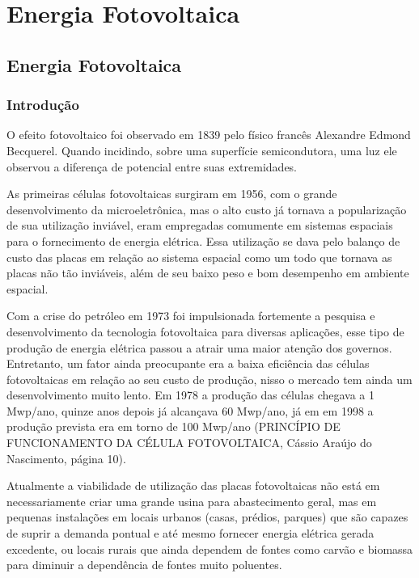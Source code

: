 \part{Energia Fotovoltaica}
\chapter[Energia Fotovoltaica]{Energia Fotovoltaica}

\section{Introdução}

O efeito fotovoltaico foi observado em 1839 pelo físico francês Alexandre Edmond Becquerel. Quando incidindo, sobre uma superfície semicondutora, uma luz ele observou a diferença de potencial entre suas extremidades.

As primeiras células fotovoltaicas surgiram em 1956, com o grande desenvolvimento da microeletrônica, mas o alto custo já tornava a popularização de sua utilização inviável, eram empregadas comumente em sistemas espaciais para o fornecimento de energia elétrica. Essa utilização se dava pelo balanço de custo das placas em relação ao sistema espacial como um todo que tornava as placas não tão inviáveis, além de seu baixo peso e bom desempenho em ambiente espacial.

Com a crise do petróleo em 1973 foi impulsionada fortemente a pesquisa e desenvolvimento da tecnologia fotovoltaica para diversas aplicações, esse tipo de produção de energia elétrica passou a atrair uma maior atenção dos governos. Entretanto, um fator ainda preocupante era a baixa eficiência das células fotovoltaicas em relação ao seu custo de produção, nisso o mercado tem ainda um desenvolvimento muito lento. Em 1978 a produção das células chegava a 1 Mwp/ano, quinze anos depois já alcançava 60 Mwp/ano, já em em 1998 a produção prevista era em torno de 100 Mwp/ano (PRINCÍPIO DE FUNCIONAMENTO DA CÉLULA FOTOVOLTAICA, Cássio Araújo do Nascimento, página 10).

Atualmente a viabilidade de utilização das placas fotovoltaicas não está em necessariamente criar uma grande usina para abastecimento geral, mas em pequenas instalações em locais urbanos (casas, prédios, parques) que são capazes de suprir a demanda pontual e até mesmo fornecer energia elétrica gerada excedente, ou locais rurais que ainda dependem de fontes como carvão e biomassa para diminuir a dependência de fontes muito poluentes. 

